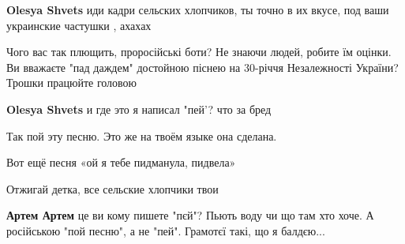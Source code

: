 \begin{itemize}
\begin{itemize}
\begin{itemize}
 
\textbf{Olesya Shvets} иди кадри сельских хлопчиков, ты точно в их вкусе, под ваши украинские частушки , ахахах
\end{itemize}

 

Чого вас так плющить, проросійські боти? Не знаючи людей, робите їм оцінки. Ви
вважаєте "пад даждем" достойною піснею на 30-річчя Незалежності України? Трошки
працюйте головою

\begin{itemize}
 
\textbf{Olesya Shvets} и где это я написал "пей'? что за бред
\end{itemize}

 

Так пой эту песню. Это же на твоём языке она сделана.

Вот ещё песня «ой я тебе пидманула, пидвела»

Отжигай детка, все сельские хлопчики твои 🤣

\begin{itemize}
 
\textbf{Артем Артем} це ви кому пишете "пєй"? Пьють воду чи що там хто хоче. А
російською "пой песню", а не "пей". Грамотєї такі, що я балдєю...


\end{itemize}
\end{itemize}
\end{itemize}

